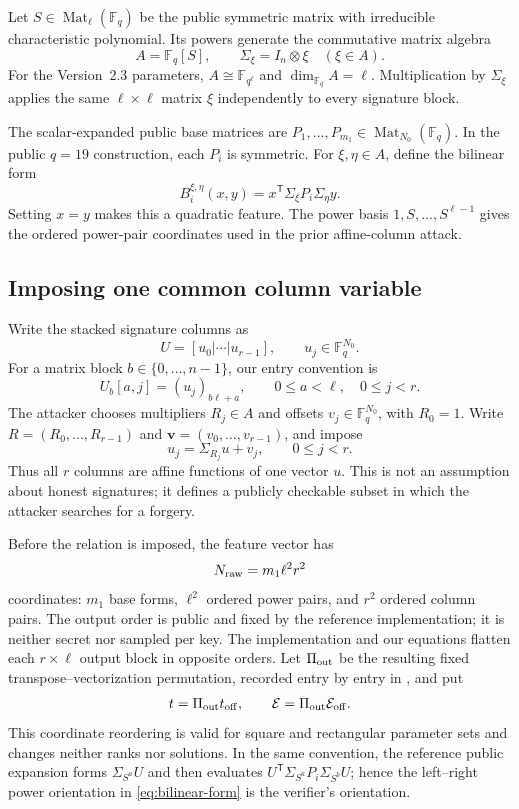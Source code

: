 \documentclass[11pt]{article}
\newcommand{\F}{\mathbb F}
\newcommand{\Mat}{\operatorname{Mat}}
\newcommand{\transpose}{\mathsf T}
\begin{document}
Let $S\in\Mat_\ell(\F_q)$ be the public symmetric matrix with irreducible
characteristic polynomial.  Its powers generate the commutative matrix
algebra
\[
 A=\F_q[S],\qquad \Sigma_\xi=I_n\otimes\xi\quad(\xi\in A).
\]
For the Version~2.3 parameters, $A\cong\F_{q^\ell}$ and
$\dim_{\F_q}A=\ell$.  Multiplication by $\Sigma_\xi$ applies the same
$\ell\times\ell$ matrix $\xi$ independently to every signature block.

The scalar-expanded public base matrices are
$P_1,\ldots,P_{m_1}\in\Mat_{N_0}(\F_q)$.  In the public $q=19$ construction,
each $P_i$ is symmetric.  For $\xi,\eta\in A$, define the bilinear form
\begin{equation}\label{eq:bilinear-form}
 B_i^{\xi,\eta}(x,y)=x^\transpose\Sigma_\xi P_i\Sigma_\eta y.
\end{equation}
Setting $x=y$ makes this a quadratic feature.  The power basis
$1,S,\ldots,S^{\ell-1}$ gives the ordered power-pair coordinates used in the
prior affine-column attack.

\subsection{Imposing one common column variable}\label{sec:affine-columns}

Write the stacked signature columns as
\[
  U=[u_0|\cdots|u_{r-1}],\qquad u_j\in\F_q^{N_0}.
\]
For a matrix block $b\in\{0,\ldots,n-1\}$, our entry convention is
\[
  U_b[a,j]=(u_j)_{b\ell+a},
  \qquad 0\le a<\ell,\quad 0\le j<r.
\]
The attacker chooses multipliers $R_j\in A$ and offsets
$v_j\in\F_q^{N_0}$, with $R_0=1$.  Write
$R=(R_0,\ldots,R_{r-1})$ and
$\mathbf v=(v_0,\ldots,v_{r-1})$, and impose
\begin{equation}\label{eq:relation}
 u_j=\Sigma_{R_j}u+v_j,
 \qquad 0\le j<r.
\end{equation}
Thus all $r$ columns are affine functions of one vector $u$.  This is not an
assumption about honest signatures; it defines a publicly checkable subset in
which the attacker searches for a forgery.

Before the relation is imposed, the feature vector has
\[
  N_{\rm raw}=m_1\ell^2r^2
\]
coordinates: $m_1$ base forms, $\ell^2$ ordered power pairs, and $r^2$ ordered
column pairs.  The output order is public and fixed by the reference
implementation; it is neither secret nor sampled per key.  The implementation
and our equations flatten each $r\times\ell$ output block in opposite orders.
Let $\Pi_{\rm out}$ be the resulting fixed transpose--vectorization
permutation, recorded entry by entry in
, and put
\[
  t=\Pi_{\rm out}t_{\rm off},\qquad
  \mathcal E=\Pi_{\rm out}\mathcal E_{\rm off}.
\]
This coordinate reordering is valid for square and rectangular parameter sets
and changes neither ranks nor solutions.  In the same convention, the
reference public expansion forms
$\Sigma_{S^a}U$ and then evaluates
$U^\transpose\Sigma_{S^a}P_i\Sigma_{S^b}U$; hence the left--right power
orientation in \eqref{eq:bilinear-form} is the verifier's orientation.
\end{document}
